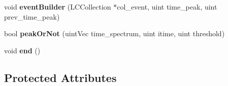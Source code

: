 \begin{DoxyCompactItemize}
\item 
void {\bfseries event\-Builder} (L\-C\-Collection $\ast$col\-\_\-event, uint time\-\_\-peak, uint prev\-\_\-time\-\_\-peak)\label{classTriventProc_a780ee8e577ab2b70de6d416bd648b78d}

\item 
bool {\bfseries peak\-Or\-Not} (uint\-Vec time\-\_\-spectrum, uint itime, uint threshold)\label{classTriventProc_a9416baadb33709d4ae1249d25f65ff69}

\item 
void {\bfseries end} ()\label{classTriventProc_a0e407d5f7aa553911600c06a63e0de32}

\end{DoxyCompactItemize}
\subsection*{Protected Attributes}
